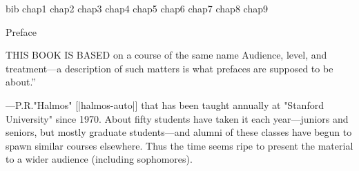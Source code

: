 
 bib
 chap1
 chap2
 chap3
 chap4
 chap5
 chap6
 chap7
 chap8
 chap9


\beginchapter {} Preface

THIS BOOK IS BASED on a course of the same name
\g\noindent{}Audience, level, and treatment\dash---a description of such matters
is what prefaces are supposed to be about.''\par
\hfill\kern-10pt\dash---P.\thinspace R.\thinspace "Halmos"
 [|halmos-auto|]\g %
that has been taught annually
at "Stanford University" since 1970. About fifty students have taken it each
year\dash---juniors and seniors, but mostly graduate students\dash---and
alumni of these classes have begun to spawn similar courses elsewhere.
Thus the time seems ripe to present the
material to a wider audience (including sophomores).

